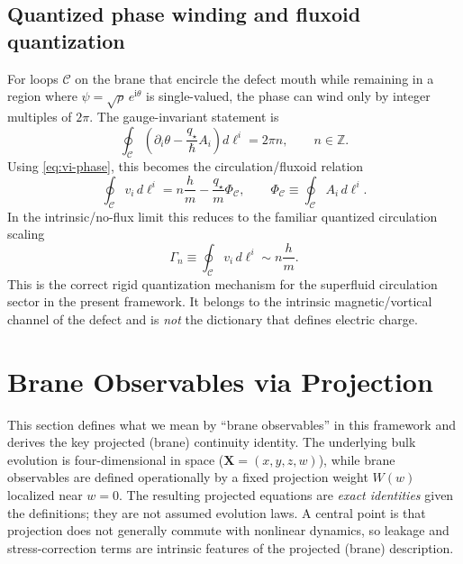 \documentclass[11pt]{article}
\newcommand{\ii}{\mathrm{i}}
\newcommand{\qstar}{q_\star}
\begin{document}
\subsection{Quantized phase winding and fluxoid quantization}
\label{sec:eom-winding}

For loops $\mathcal C$ on the brane that encircle the defect mouth while remaining in a region where $\psi=\sqrt{\rho}\,e^{\ii\theta}$ is single-valued, the phase can wind only by integer multiples of $2\pi$. The gauge-invariant statement is
\begin{equation}
\oint_{\mathcal C}\left(\partial_i\theta-\frac{\qstar}{\hbar}A_i\right)d\ell^i = 2\pi n,
\qquad n\in\mathbb{Z}.
\label{eq:fluxoid-quantization}
\end{equation}
Using \eqref{eq:vi-phase}, this becomes the circulation/fluxoid relation
\begin{equation}
\oint_{\mathcal C} v_i\,d\ell^i
=
n\frac{h}{m}
-\frac{\qstar}{m}\Phi_{\mathcal C},
\qquad
\Phi_{\mathcal C}\equiv \oint_{\mathcal C} A_i\,d\ell^i.
\label{eq:circulation-fluxoid}
\end{equation}
In the intrinsic/no-flux limit this reduces to the familiar quantized circulation scaling
\begin{equation}
\Gamma_n \equiv \oint_{\mathcal C} v_i\,d\ell^i \sim n\frac{h}{m}.
\end{equation}
This is the correct rigid quantization mechanism for the superfluid circulation sector in the present framework. It belongs to the intrinsic magnetic/vortical channel of the defect and is \emph{not} the dictionary that defines electric charge.

\section{Brane Observables via Projection}
\label{sec:projection}

This section defines what we mean by ``brane observables'' in this framework and derives the key projected (brane) continuity identity. The underlying bulk evolution is four-dimensional in space ($\mathbf{X}=(x,y,z,w)$), while brane observables are defined operationally by a fixed projection weight $W(w)$ localized near $w=0$. The resulting projected equations are \emph{exact identities} given the definitions; they are not assumed evolution laws. A central point is that projection does not generally commute with nonlinear dynamics, so leakage and stress-correction terms are intrinsic features of the projected (brane) description.
\end{document}
